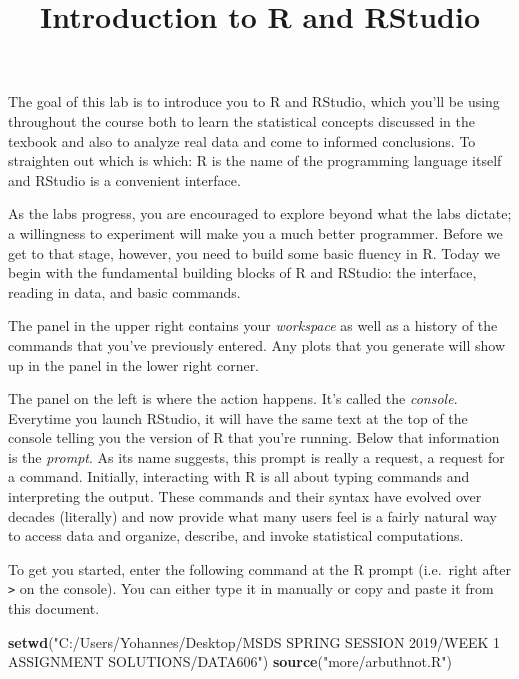 \documentclass[]{article}
\title{Introduction to R and RStudio}
\author{}
\date{}
\newenvironment{Shaded}{\begin{snugshade}}{\end{snugshade}}
\newcommand{\KeywordTok}[1]{\textcolor[rgb]{0.13,0.29,0.53}{\textbf{#1}}}
\newcommand{\StringTok}[1]{\textcolor[rgb]{0.31,0.60,0.02}{#1}}
\newcommand{\NormalTok}[1]{#1}
\begin{document}
\maketitle

The goal of this lab is to introduce you to R and RStudio, which you'll
be using throughout the course both to learn the statistical concepts
discussed in the texbook and also to analyze real data and come to
informed conclusions. To straighten out which is which: R is the name of
the programming language itself and RStudio is a convenient interface.

As the labs progress, you are encouraged to explore beyond what the labs
dictate; a willingness to experiment will make you a much better
programmer. Before we get to that stage, however, you need to build some
basic fluency in R. Today we begin with the fundamental building blocks
of R and RStudio: the interface, reading in data, and basic commands.

The panel in the upper right contains your \emph{workspace} as well as a
history of the commands that you've previously entered. Any plots that
you generate will show up in the panel in the lower right corner.

The panel on the left is where the action happens. It's called the
\emph{console}. Everytime you launch RStudio, it will have the same text
at the top of the console telling you the version of R that you're
running. Below that information is the \emph{prompt}. As its name
suggests, this prompt is really a request, a request for a command.
Initially, interacting with R is all about typing commands and
interpreting the output. These commands and their syntax have evolved
over decades (literally) and now provide what many users feel is a
fairly natural way to access data and organize, describe, and invoke
statistical computations.

To get you started, enter the following command at the R prompt
(i.e.~right after \texttt{\textgreater{}} on the console). You can
either type it in manually or copy and paste it from this document.

\begin{Shaded}
\begin{Highlighting}[]
\KeywordTok{setwd}\NormalTok{(}\StringTok{"C:/Users/Yohannes/Desktop/MSDS SPRING SESSION 2019/WEEK 1 ASSIGNMENT SOLUTIONS/DATA606"}\NormalTok{)}
\KeywordTok{source}\NormalTok{(}\StringTok{"more/arbuthnot.R"}\NormalTok{)}
\end{Highlighting}
\end{Shaded}
\end{document}
